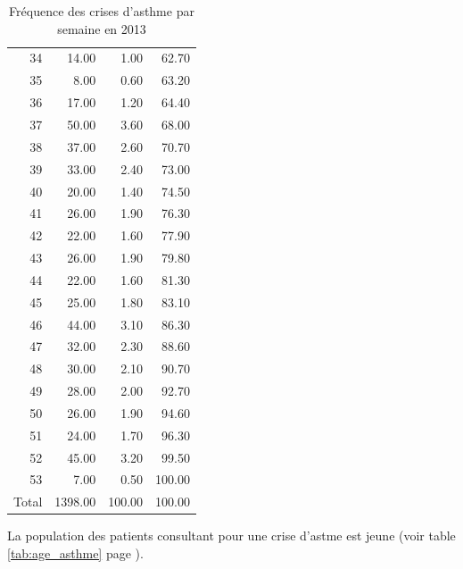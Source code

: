 \documentclass[12pt,english,french,twoside]{book}\usepackage[]{graphicx}\usepackage[]{color}
\makeatletter
\newenvironment{kframe}{%
 \def\at@end@of@kframe{}%
 \ifinner\ifhmode%
  \def\at@end@of@kframe{\end{minipage}}%
  \begin{minipage}{\columnwidth}%
 \fi\fi%
 \def\FrameCommand##1{\hskip\@totalleftmargin \hskip-\fboxsep
 \colorbox{shadecolor}{##1}\hskip-\fboxsep
     \hskip-\linewidth \hskip-\@totalleftmargin \hskip\columnwidth}%
 \MakeFramed {\advance\hsize-\width
   \@totalleftmargin\z@ \linewidth\hsize
   \@setminipage}}%
 {\par\unskip\endMakeFramed%
 \at@end@of@kframe}
\makeatother
\begin{document}
\begin{table}[ht]
\begin{tabular}{rrrr}
  34 & 14.00 & 1.00 & 62.70 \\ 
  35 & 8.00 & 0.60 & 63.20 \\ 
  36 & 17.00 & 1.20 & 64.40 \\ 
  37 & 50.00 & 3.60 & 68.00 \\ 
  38 & 37.00 & 2.60 & 70.70 \\ 
  39 & 33.00 & 2.40 & 73.00 \\ 
  40 & 20.00 & 1.40 & 74.50 \\ 
  41 & 26.00 & 1.90 & 76.30 \\ 
  42 & 22.00 & 1.60 & 77.90 \\ 
  43 & 26.00 & 1.90 & 79.80 \\ 
  44 & 22.00 & 1.60 & 81.30 \\ 
  45 & 25.00 & 1.80 & 83.10 \\ 
  46 & 44.00 & 3.10 & 86.30 \\ 
  47 & 32.00 & 2.30 & 88.60 \\ 
  48 & 30.00 & 2.10 & 90.70 \\ 
  49 & 28.00 & 2.00 & 92.70 \\ 
  50 & 26.00 & 1.90 & 94.60 \\ 
  51 & 24.00 & 1.70 & 96.30 \\ 
  52 & 45.00 & 3.20 & 99.50 \\ 
  53 & 7.00 & 0.50 & 100.00 \\ 
    Total & 1398.00 & 100.00 & 100.00 \\ 
   \hline
\end{tabular}
\caption[Fréquence des crises d'asthme]{Fréquence des crises d'asthme par semaine en 2013} 
\label{tab:freq_asthme}
\end{table}




La population des patients consultant pour une crise d'astme est jeune (voir table \ref{tab:age_asthme} page \pageref{tab:age_asthme}).

\begin{kframe}


{\ttfamily\noindent\bfseries\color{errorcolor}{\#\# Error: invalid 'row.names' length}}

{\ttfamily\noindent\color{warningcolor}{\#\# Warning: argument is not numeric or logical: returning NA}}

{\ttfamily\noindent\bfseries\color{errorcolor}{\#\# Error: need numeric data}}

{\ttfamily\noindent\bfseries\color{errorcolor}{\#\# Error: attempt to set 'rownames' on an object with no dimensions}}

{\ttfamily\noindent\bfseries{}}\end{kframe}
\end{document}

